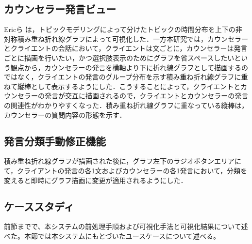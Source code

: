 \documentclass[shuuron]{kuee}
\begin{document}




\subsection{カウンセラー発言ビュー}

Ericら\cite{taskdriven}
は，トピックモデリングによって分けたトピックの時間分布を上下の非対称積み重ね折れ線グラフによって可視化した．一方本研究では，カウンセラーとクライエントの会話において，クライエントは文ごとに，カウンセラーは発言ごとに描画を行いたい，かつ選択肢表示のためにグラフを省スペースしたいという観点から，カウンセラーの発言を横軸より下に折れ線グラフとして描画するのではなく，クライエントの発言のグループ分布を示す積み重ね折れ線グラフに重ねて縦棒として表示するようにした．こうすることによって，クライエントとカウンセラーの発言が交互に描画されるので，クライエントとカウンセラーの発言の関連性がわかりやすくなった．積み重ね折れ線グラフに重なっている縦棒は，カウンセラーの質問内容の形態を示す．


\subsection{発言分類手動修正機能}
積み重ね折れ線グラフが描画された後に，グラフ左下のラジオボタンエリアにて，クライアントの発言の各1文およびカウンセラーの各1発言において，分類を変えると即時にグラフ描画に変更が適用されるようにした．








\subsection{ケーススタディ}

前節までで、本システムの前処理手順および可視化手法と可視化結果について述べた。本節では本システムにもとづいたユースケースについて述べる。
\end{document}
